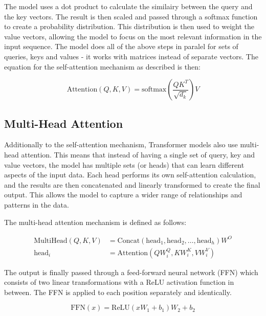 \documentclass[twoside]{ctuthesis}
\theoremstyle{plain}
\theoremstyle{definition}
\theoremstyle{note}
\begin{document}
The model uses a dot product to calculate the similairy between the query and the key vectors. The result is then scaled and passed through a softmax function to create a probability distribution. This distribution is then used to weight the value vectors, allowing the model to focus on the most relevant information in the input sequence. The model does all of the above steps in paralel for sets of queries, keys and values - it works with matrices instead of separate vectors. The equation for the self-attention mechanism as described is then: \par

\begin{equation}
	\text{Attention}(Q, K, V) = \text{softmax}\left(\frac{QK^T}{\sqrt{d_k}}\right)V
\end{equation}


\subsection{Multi-Head Attention}

Additionally to the self-attention mechanism, Transformer models also use multi-head attention. This means that instead of having a single set of query, key and value vectors, the model has multiple sets (or heads) that can learn different aspects of the input data. Each head performs its own self-attention calculation, and the results are then concatenated and linearly transformed to create the final output. This allows the model to capture a wider range of relationships and patterns in the data.\par
The multi-head attention mechanism is defined as follows:

\begin{align}
	\text{MultiHead}(Q, K, V) &= \text{Concat}(\text{head}_1, \text{head}_2, \ldots, \text{head}_h)W^O \\
	\text{head}_i &= \text{Attention}(QW_i^Q, KW_i^K, VW_i^V)
\end{align}

The output is finally passed through a feed-forward neural network (FFN) which consists of two linear transformations with a ReLU activation function in between. The FFN is applied to each position separately and identically.\par

\begin{equation}
	\text{FFN}(x) = \text{ReLU}(xW_1 + b_1)W_2 + b_2 
\end{equation}
\end{document}
